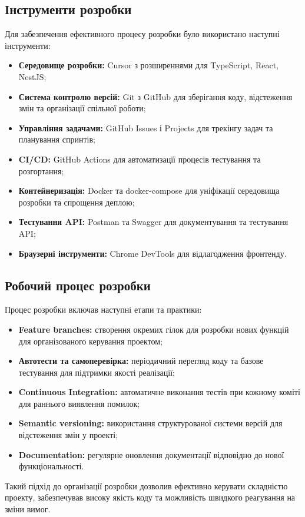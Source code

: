 \subsection{Інструменти розробки}
Для забезпечення ефективного процесу розробки було використано наступні інструменти:
\begin{itemize}
    \item \textbf{Середовище розробки:} Cursor з розширеннями для TypeScript, React, NestJS;
    \item \textbf{Система контролю версій:} Git з GitHub для зберігання коду, відстеження змін та організації спільної роботи;
    \item \textbf{Управління задачами:} GitHub Issues і Projects для трекінгу задач та планування спринтів;
    \item \textbf{CI/CD:} GitHub Actions для автоматизації процесів тестування та розгортання;
    \item \textbf{Контейнеризація:} Docker та docker-compose для уніфікації середовища розробки та спрощення деплою;
    \item \textbf{Тестування API:} Postman та Swagger для документування та тестування API;
    \item \textbf{Браузерні інструменти:} Chrome DevTools для відлагодження фронтенду.
\end{itemize}

\subsection{Робочий процес розробки}
Процес розробки включав наступні етапи та практики:
\begin{itemize}
    \item \textbf{Feature branches:} створення окремих гілок для розробки нових функцій для організованого керування проектом;
    \item \textbf{Автотести та самоперевірка:} періодичний перегляд коду та базове тестування для підтримки якості реалізації;
    \item \textbf{Continuous Integration:} автоматичне виконання тестів при кожному коміті для раннього виявлення помилок;
    \item \textbf{Semantic versioning:} використання структурованої системи версій для відстеження змін у проекті;
    \item \textbf{Documentation:} регулярне оновлення документації відповідно до нової функціональності.
\end{itemize}
Такий підхід до організації розробки дозволив ефективно керувати складністю проекту, забезпечував високу якість коду та можливість швидкого реагування на зміни вимог.

